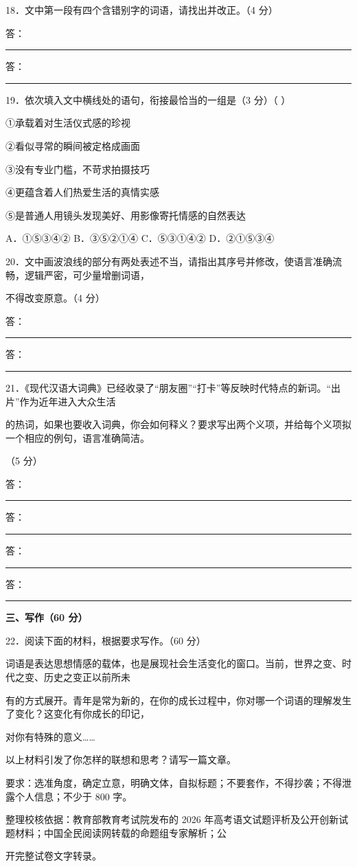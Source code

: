 \documentclass[UTF8,a4paper,fontset=fandol]{ctexart}
\begin{document}
18．文中第一段有四个含错别字的词语，请找出并改正。（4 分）\par
\noindent 答：\rule{0.88\linewidth}{0.35pt}\par
\noindent 答：\rule{0.88\linewidth}{0.35pt}\par
19．依次填入文中横线处的语句，衔接最恰当的一组是（3 分）（ ）\par
①承载着对生活仪式感的珍视\par
②看似寻常的瞬间被定格成画面\par
③没有专业门槛，不苛求拍摄技巧\par
④更蕴含着人们热爱生活的真情实感\par
⑤是普通人用镜头发现美好、用影像寄托情感的自然表达\par
A．①⑤③④② B．③⑤②①④ C．⑤③①④② D．②①⑤③④\par
\vspace{0.35em}\par
20．文中画波浪线的部分有两处表述不当，请指出其序号并修改，使语言准确流畅，逻辑严密，可少量增删词语，\par
不得改变原意。（4 分）\par
\noindent 答：\rule{0.88\linewidth}{0.35pt}\par
\noindent 答：\rule{0.88\linewidth}{0.35pt}\par
21．《现代汉语大词典》已经收录了“朋友圈”“打卡”等反映时代特点的新词。“出片”作为近年进入大众生活\par
的热词，如果也要收入词典，你会如何释义？要求写出两个义项，并给每个义项拟一个相应的例句，语言准确简洁。\par
（5 分）\par
\noindent 答：\rule{0.88\linewidth}{0.35pt}\par
\noindent 答：\rule{0.88\linewidth}{0.35pt}\par
\noindent 答：\rule{0.88\linewidth}{0.35pt}\par
\noindent 答：\rule{0.88\linewidth}{0.35pt}\par
\clearpage
\vspace{0.25em}\textbf{三、写作（60 分）}\par
22．阅读下面的材料，根据要求写作。（60 分）\par
\hspace*{1.8em}词语是表达思想情感的载体，也是展现社会生活变化的窗口。当前，世界之变、时代之变、历史之变正以前所未\par
有的方式展开。青年是常为新的，在你的成长过程中，你对哪一个词语的理解发生了变化？这变化有你成长的印记，\par
对你有特殊的意义……\par
\hspace*{1.8em}以上材料引发了你怎样的联想和思考？请写一篇文章。\par
\hspace*{1.8em}要求：选准角度，确定立意，明确文体，自拟标题；不要套作，不得抄袭；不得泄露个人信息；不少于 800 字。\par
\vspace{0.35em}\par
\vspace{0.35em}\par
整理校核依据：教育部教育考试院发布的 2026 年高考语文试题评析及公开创新试题材料；中国全民阅读网转载的命题组专家解析；公\par
开完整试卷文字转录。\par
\clearpage
\end{document}
